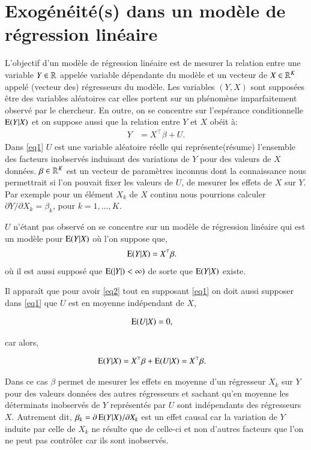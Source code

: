 \documentclass[10pt, reqno]{amsart}
\begin{document}
\section{Exogénéité(s) dans un modèle de régression linéaire}
L'objectif d'un modèle de régression linéaire est de mesurer la relation entre une variable $Y\in\mathbb{R}$ 
appelée variable dépendante du modèle et un vecteur de $X\in\mathbb{R}^K$ appelé (vecteur des) régresseurs du modèle. 
Les variables $(Y, X)$ sont supposées être des variables aléatoires car elles portent sur un phénomène imparfaitement 
observé par le chercheur. En outre, on se concentre sur l'espérance conditionnelle $\operatorname{E}(Y|X)$ et on suppose aussi
que la relation entre $Y$ et $X$ obéit à:
\begin{align}
	Y &= X^\top \beta + U.
	\label{eq1}
\end{align}
Dans \eqref{eq1} $U$ est une variable aléatoire réelle qui représente(résume) l'ensemble des facteurs inobservés 
induisant des variations de $Y$ pour des valeurs de $X$ données. $\beta\in\mathbb{R}^K$ est 
un vecteur de paramètres inconnus dont la connaissance nous permettrait 
si l'on pouvait fixer les valeurs de $U$, de mesurer les effets de $X$ sur $Y$. Par exemple pour un élément $X_k$ 
de $X$ continu nous pourrions calculer $\partial Y/\partial X_k = \beta_k$, pour $k = 1, \ldots, K$.

$U$ n'étant pas observé on se concentre sur un modèle de régression linéaire qui est un modèle pour $\operatorname{E}(Y|X)$ 
où l'on suppose que,
\begin{align}
	\operatorname{E}(Y|X) &= X^\top \beta.
	\label{eq2}
\end{align}
où il est aussi  supposé que $\operatorname{E}(\left\vert {Y} \right\vert) < \infty)$ de sorte que $\operatorname{E}(Y|X)$ existe.

Il apparaît que pour avoir \eqref{eq2} tout en supposant \eqref{eq1} on doit 
aussi supposer dans \eqref{eq1} que $U$ est en moyenne indépendant de $X$,

\begin{align}
\operatorname{E}(U|X) &=0,
\label{eq3}
\end{align}

 car alors,

\begin{align*}
	\operatorname{E}(Y|X)&=X^\top\beta +\operatorname{E}(U|X) = X^\top\beta.
\end{align*}

Dans ce cas $\beta$ permet de mesurer les effets en moyenne d'un régresseur $X_k$ sur $Y$ pour 
des valeurs données des autres régresseurs et sachant qu'en moyenne 
les déterminats inobservés de $Y$ représentés par $U$ sont indépendants des régresseurs $X$. Autrement dit,
$\beta_k = \partial \operatorname{E}(Y|X)/\partial X_k$ est un effet causal car la variation de $Y$ induite par celle de $X_k$
ne résulte que de celle-ci et non d'autres facteurs que l'on ne peut pas contrôler car ils sont inobservés.
\end{document}
